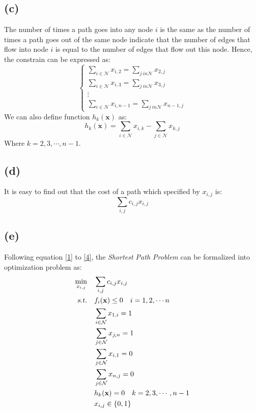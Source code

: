 \documentclass[10pt,a4paper]{article}
\begin{document}
\subsection*{(c)}
The number of times a path goes into any node $i$ is the same as the number of times a path goes out of the same node indicate that the number of edges that flow into node $i$ is equal to the number of edges that flow out this node. Hence, the constrain can be expressed as:
\begin{equation}
	\begin{cases}
		\displaystyle\sum_{i \in \mathcal{N}} x_{i, 2} = \displaystyle\sum_{j \ in \mathcal{N}} x_{2, j} \\
		\displaystyle\sum_{i \in \mathcal{N}} x_{i, 3} = \displaystyle\sum_{j \ in \mathcal{N}} x_{3, j} \\
		\vdots \\
		\displaystyle\sum_{i \in \mathcal{N}} x_{i, n - 1} = \displaystyle\sum_{j \ in \mathcal{N}} x_{n - 1, j}
	\end{cases}
\end{equation}
We can also define function $h_{k}(\mathbf{x})$ as:
\begin{equation}
	h_{k}(\mathbf{x}) = \displaystyle\sum_{i \in \mathcal{N}} x_{i, k} -\displaystyle\sum_{j \in \mathcal{N}} x_{k, j}
\end{equation}
Where $k = 2, 3, \cdots, n - 1$.

\subsection*{(d)}
It is easy to find out that the cost of a path which specified by $x_{i,j}$ is:
\begin{equation}
	\displaystyle\sum_{i, j} c_{i, j} x_{i, j}
	\label{4}
\end{equation}

\subsection*{(e)}
Following equation \ref{1} to \ref{4}, the \textit{Shortest Path Problem} can be formalized into optimization problem as:
\begin{equation}
	\begin{aligned}
		\displaystyle\min_{x_{i,j}} \quad & \displaystyle\sum_{i, j} c_{i, j} x_{i, j} \\
		\textsl{s.t.} \quad & f_{i}(\mathbf{x}) \leq 0  \quad i = 1, 2, \cdots n \\
		& \displaystyle\sum_{i \in \mathcal{N}} x_{1, i} = 1 \\
		& \displaystyle\sum_{j \in \mathcal{N}} x_{j, n} = 1 \\
		& \displaystyle\sum_{j \in \mathcal{N}} x_{i, 1} = 0 \\
		& \displaystyle\sum_{j \in \mathcal{N}} x_{n, j} = 0 \\
		& h_{k}(\mathbf{x}) = 0 \quad k = 2, 3, \cdots, n - 1 \\
		& x_{i, j} \in \{ 0, 1 \}
	\end{aligned}
\end{equation}
\end{document}
